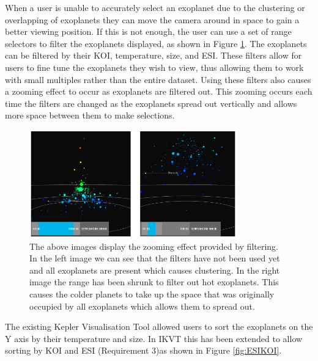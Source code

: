 When a user is unable to accurately select an
exoplanet due to the clustering or
overlapping of exoplanets they can move the camera around in space to gain a
better viewing position. If this is not
enough, the user can use a set of range selectors to filter the exoplanets
displayed, as shown in Figure \ref{fig:zoomFilter}. The exoplanets can be
filtered by their KOI,
temperature, size, and ESI. These filters allow for
users to fine tune the exoplanets they wish to view, thus allowing them to work
with small multiples rather than the entire dataset. Using
these filters also causes a zooming effect to occur as exoplanets are filtered
out.
This zooming occurs each time the filters are changed as the exoplanets spread
out vertically and allows more space between them to make selections.

\begin{figure}[H]
  \centering
      \includegraphics[width=0.8\textwidth]{images/zoomFilter.png}
  \caption[Zooming effect provided by filtering]{The above images display the
zooming effect provided by filtering. In the left image we can see that the
filters have not been used yet and all exoplanets are present which causes
clustering. In the right image the range has been  shrunk to filter out hot
exoplanets. This causes the colder planets to take up the space that was
originally occupied by all exoplanets which allows them to spread out.}  
    \label{fig:zoomFilter}
\end{figure}

The existing Kepler Visualisation Tool allowed users to sort the exoplanets on
the Y axis by their temperature and size. In IKVT this has been extended to
allow sorting by KOI and ESI (Requirement 3)as shown in Figure \ref{fig:ESIKOI}.


